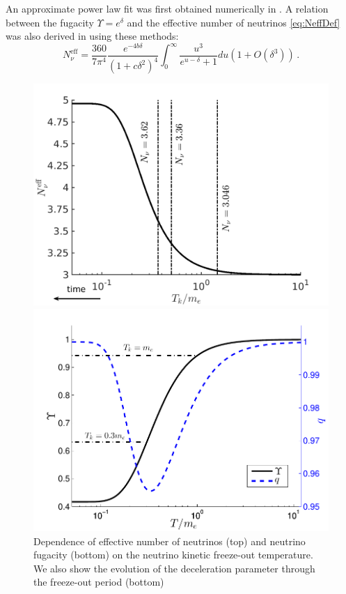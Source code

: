 An approximate power law fit was first obtained numerically in \cite{Birrell:2013gpa}. A relation between the fugacity $\Upsilon=e^\delta$ and the effective number of neutrinos \eqref{eq:NeffDef} was also derived in \cite{Birrell:2012gg} using these methods:
\begin{equation}\label{eq:NnuApprox}
N^{\mathrm{eff}}_\nu=\frac{360}{7\pi^4}\frac{e^{-4b\delta}}{(1+c\delta^2)^4}\int_0^\infty \frac{u^3}{e^{u-\delta}+1}du\left(1+O(\delta^3)\right)\,.
\end{equation}


\begin{figure}
\centerline{\includegraphics[width=0.90\linewidth]{plots/N_eff.pdf}}
\centerline{\includegraphics[width=0.90\linewidth]{plots/Upsilon_q.pdf}}
\caption{Dependence of effective number of neutrinos (top) and neutrino fugacity (bottom) on the neutrino kinetic freeze-out temperature. We also show the evolution of the deceleration parameter through the freeze-out period (bottom)}
\label{fig:Tk_dependence}
\end{figure}
